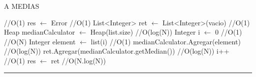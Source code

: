 
\begin{algorithm}[H]
\caption{A MEDIAS}
\begin{algorithmic}[1]
 \hfill //O(1)
\state res $\gets$ Error \hfill //O(1)
\endif
\state List<Integer> ret $\gets$ List<Integer>(vacio) \hfill //O(1)
\state Heap medianCalculator $\gets$ Heap(list.size) \hfill //O(log(N))
\state Integer i $\gets$ 0 \hfill //O(1)
 \hfill //O(N) %
\state Integer element  $\gets$ list(i) \hfill //O(1)
\state medianCalculator.Agregar(element) \hfill //O(log(N))
\state ret.Agregar(medianCalculator.getMedian()) \hfill //O(log(N))
\state i++ \hfill //O(1)
\endwhile
\state res $\gets$  ret \hfill //O(N.log(N))
\EndFunction 
\end{algorithmic}
\hrule
{}
\end{algorithm}

